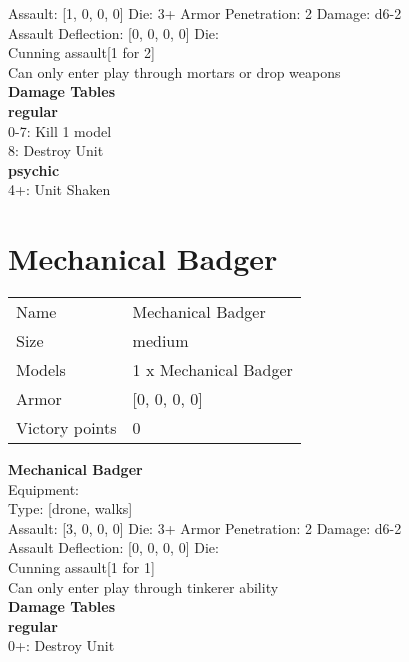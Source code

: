 Assault: [1, 0, 0, 0] Die: 3+ Armor Penetration: 2 Damage: d6-2 \\
Assault Deflection: [0, 0, 0, 0] Die: \\
\indent Cunning assault[1 for 2]\\ 
 

Can only enter play through mortars or drop weapons\\ 


 





{\bf Damage Tables} \\
 {\bf regular } \\
0-7: Kill 1 model \\
8: Destroy Unit \\
 {\bf psychic } \\
4+: Unit Shaken \\










\pagebreak\pagebreak

\section{ Mechanical Badger }

\begin{tabular}{ll}
  Name & Mechanical Badger \\
  Size & medium\\
  Models & 1 x Mechanical Badger\\
  Armor & [0, 0, 0, 0]\\
  Victory points & 0\\
\end{tabular}

{\bf Mechanical Badger } \\
Equipment:  \\
Type: [drone, walks] \\

Assault: [3, 0, 0, 0] Die: 3+ Armor Penetration: 2 Damage: d6-2 \\
Assault Deflection: [0, 0, 0, 0] Die: \\
\indent Cunning assault[1 for 1]\\ 
 

Can only enter play through tinkerer ability\\ 


 





{\bf Damage Tables} \\
 {\bf regular } \\
0+: Destroy Unit \\










\pagebreak
